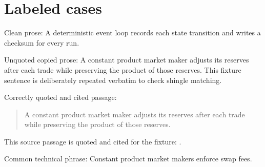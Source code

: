 \section{Labeled cases}

Clean prose: A deterministic event loop records each state transition and writes a
checksum for every run.

Unquoted copied prose: A constant product market maker adjusts its reserves after
each trade while preserving the product of those reserves. This fixture sentence is
deliberately repeated verbatim to check shingle matching.

Correctly quoted and cited passage:
\begin{quote}
A constant product market maker adjusts its reserves after each trade while
preserving the product of those reserves.
\end{quote}
This source passage is quoted and cited for the fixture: \cite{fixture2026}.

Common technical phrase: Constant product market makers enforce swap fees.
